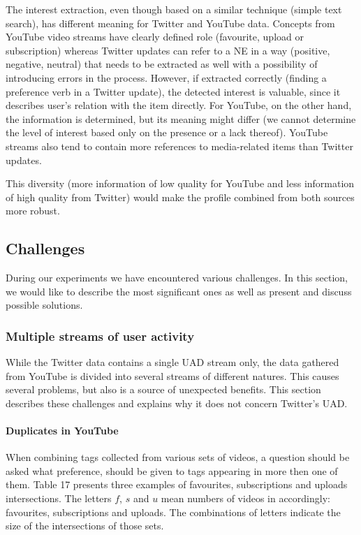 The interest extraction, even though based on a similar technique (simple text
search), has different meaning for Twitter and YouTube data.  Concepts from
YouTube video streams have clearly defined role (favourite, upload or
subscription) whereas Twitter updates can refer to a NE in a way (positive,
negative, neutral) that needs to be extracted as well with a possibility of
introducing errors in the process. However, if extracted correctly (finding a
preference verb in a Twitter update), the detected interest is valuable,
since it describes user's relation with the item directly. For YouTube, on the
other hand, the information is determined, but its meaning might differ (we
cannot determine the level of interest based only on the presence or a lack
thereof). YouTube streams also tend to contain more references to media-related
items than Twitter updates. 

This diversity (more information of low quality for YouTube and less
information of high quality from Twitter) would make the profile combined from
both sources more robust.

\subsection{Challenges}

During our experiments we have encountered various challenges. In this section, we would like to describe
the most significant ones as well as present and discuss possible solutions.

\subsubsection{Multiple streams of user activity}

While the Twitter data contains a single UAD stream only, the data gathered from
YouTube is divided into several streams of different natures. This causes
several problems, but also is a source of unexpected benefits. This section
describes these challenges and explains why it does not concern Twitter's UAD.

\paragraph{Duplicates in YouTube}

When combining tags collected from various sets of videos, a question should be
asked what preference, should be given to tags appearing in more
then one of them. Table 17 presents three examples of favourites,
subscriptions and uploads intersections. The letters $f$, $s$ and $u$ mean
numbers of videos in accordingly: favourites, subscriptions and uploads. The
combinations of letters indicate the size of the intersections of those sets. \\

